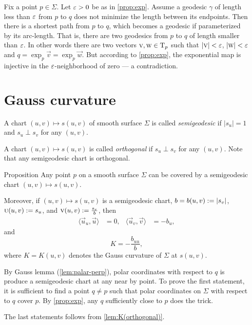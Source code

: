 Fix a point $p\in\Sigma$.
Let $\varepsilon>0$ be as in \ref{prop:exp}.
Assume a geodesic $\gamma$ of length less than $\varepsilon$ from $p$ to $q$ does not minimize the length between its endpoints.
Then there is a shortest path from $p$ to $q$, which becomes a geodesic if parameterized by its arc-length.
That is, there are two geodesics from $p$ to $q$ of length smaller than $\varepsilon$.
In other words there are two vectors ${\textsc v},\textsc w\in\mathrm{T}_p$ such that $|{\textsc v}|<\varepsilon$, $|\textsc w|<\varepsilon$ and 
$q=\exp_p\vec v=\exp_p\vec w$.
But according to \ref{prop:exp}, the exponential map is injective in the $\varepsilon$-neighborhood of zero --- a contradiction.\qeds

\section{Gauss curvature}

A chart $(u,v)\mapsto s(u,v)$ of smooth surface $\Sigma$ is called \emph{semigeodesic} if $|s_u|=1$ and $s_u\perp s_v$ for any $(u,v)$.

A chart $(u,v)\mapsto s(u,v)$ is called \emph{orthogonal} if $s_u\perp s_v$ for any $(u,v)$.
Note that any semigeodesic chart is orthogonal.

\begin{thm}{Proposition}\label{prop:K(semigeodesic)}
Any point $p$ on a smooth surface $\Sigma$ can be covered by a semigeodesic chart $(u,v)\mapsto s(u,v)$.

Moreover, if $(u,v)\mapsto s(u,v)$ is a semigeodesic chart, 
$b=b(u,v)\z\df|s_v|$,
$\textsc u(u,v):= s_u$,
and 
$\textsc v(u,v):=\tfrac{s_v}b$,
then 
\begin{align*}
\langle\vec u_u,\vec u\rangle&=0,
&
\langle\vec u_v,\vec v\rangle&=-b_u,
\end{align*}
and 
\[K=-\frac{b_{uu}}b,\]
where $K=K(u,v)$ denotes the Gauss curvature of $\Sigma$ at $s(u,v)$.

\end{thm}

By Gauss lemma (\ref{lem:palar-perp}), polar coordinates with respect to $q$ is produce a semigeodesic chart at any near by point.
To prove the first statement, it is sufficient to find a point $q\ne p$ such that polar coordinates on $\Sigma$ with respect to $q$ cover $p$.
By \ref{prop:exp}, any $q$ sufficiently close to $p$ does the trick.

The last statements follows from \ref{lem:K(orthogonal)}.
\qeds


